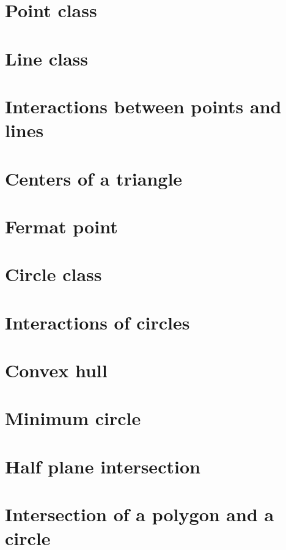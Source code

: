 \documentclass[a4paper]{report}
\begin{document}
		\section{Point class}
			
		\section{Line class}
			
		\section{Interactions between points and lines}
			
		\section{Centers of a triangle}
			
		\section{Fermat point}
			
		\section{Circle class}
			
		\section{Interactions of circles}
			
		\section{Convex hull}
			
		\section{Minimum circle}
			
		\section{Half plane intersection}
			
		\section{Intersection of a polygon and a circle}
			
\end{document}
